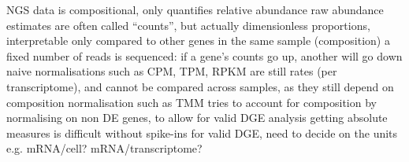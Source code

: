 \begin{outline}
\1 NGS data is compositional, only quantifies relative abundance 
    \2 raw abundance estimates are often called \enquote{counts}, but actually dimensionless proportions, interpretable only compared to other genes in the same sample (composition)
    \2 a fixed number of reads is sequenced: if a gene's counts go up, another will go down
    \2 naive normalisations such as CPM, TPM, RPKM are still rates (per transcriptome), and cannot be compared across samples, as they still depend on composition
    \2 normalisation such as TMM tries to account for composition by normalising on non DE genes, to allow for valid DGE analysis
    \2 getting absolute measures is difficult without spike-ins
    \2 for valid DGE, need to decide on the units e.g. mRNA/cell? mRNA/transcriptome? \autocite{soneson2013ComparisonMethodsDifferential}


\end{outline}
